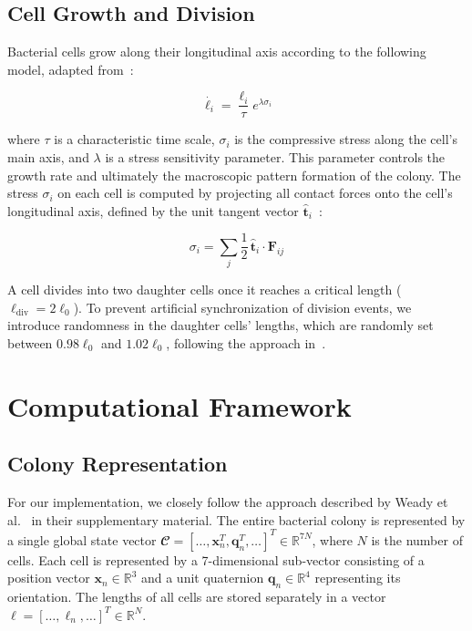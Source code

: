 \documentclass[conference]{IEEEtran}
\begin{document}
\subsection{Cell Growth and Division}

Bacterial cells grow along their longitudinal axis according to the following model, adapted from~\cite{Weady2024}:

\begin{equation} \label{eq:growth}
    \dot{{\ell_i}} = \frac{{\ell_i}}{\tau} e^{\lambda \sigma_i}
\end{equation}

where $\tau$ is a characteristic time scale, $\sigma_i$ is the compressive stress along the cell's main axis, and $\lambda$ is a stress sensitivity parameter. This parameter controls the growth rate and ultimately the macroscopic pattern formation of the colony. The stress $\sigma_i$ on each cell is computed by projecting all contact forces onto the cell's longitudinal axis, defined by the unit tangent vector $\hat{\mathbf{t}}_i$~\cite{Weady2024}:

\begin{equation} \label{eq:stress}
    \sigma_i = \sum_{j} \frac{1}{2}\, \hat{\mathbf t}_i \cdot \mathbf F_{ij}
\end{equation}


A cell divides into two daughter cells once it reaches a critical length ($\ell_\text{div} = 2\ell_0$). To prevent artificial synchronization of division events, we introduce randomness in the daughter cells' lengths, which are randomly set between $0.98\ell_0$ and $1.02\ell_0$, following the approach in~\cite{Khan_2024}.

\newpage

\section{Computational Framework}

\subsection{Colony Representation}

For our implementation, we closely follow the approach described by Weady et al.~\cite{Weady2024} in their supplementary material. The entire bacterial colony is represented by a single global state vector $\mathbfcal{C} = [\dots, \mathbf{x}_n^T, \mathbf{q}_n^T, \dots]^T \in \mathbb{R}^{7N}$, where $N$ is the number of cells. Each cell is represented by a 7-dimensional sub-vector consisting of a position vector $\mathbf{x}_n \in \mathbb{R}^3$ and a unit quaternion $\mathbf{q}_n \in \mathbb{R}^4$ representing its orientation. The lengths of all cells are stored separately in a vector $\boldsymbol{\ell} = [\dots, \ell_n, \dots]^T \in \mathbb{R}^{N}$.
\end{document}
